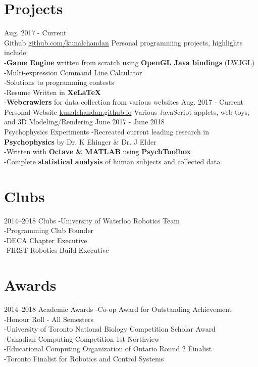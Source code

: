 \documentclass[]{chandan-cv}
\begin{document}
\section{Projects}

\begin{entrylist}
  \entry
    {Aug. 2017 - Current\\}
    {Github}
    {\href{https://github.com/kunalchandan}{github.com/kunalchandan}}
    {Personal programming projects, highlights include:
	\\-\textbf{Game Engine} written from scratch using \textbf{OpenGL Java bindings} (LWJGL)	
	\\-Multi-expression Command Line Calculator
	\\-Solutions to programming contests
	\\-Resume Written in \textbf{XeLaTeX}
	\\-\textbf{Webcrawlers} for data collection from various websites}
  \entry
    {Aug. 2017 - Current\\}
    {Personal Website}
    {\href{https://kunalchandan.github.io}{kunalchandan.github.io}}
    {Various JavaScript applets, web-toys, and 3D Modeling/Rendering}
  \entry
    {June 2017 - June 2018\\}
    {Psychophysics Experiments}
    {}
    {	-Recreated current leading research in \textbf{Psychophysics} by Dr. K Ehinger \& Dr. J Elder
	\\-Written with \textbf{Octave \& MATLAB} using \textbf{PsychToolbox}
	\\-Complete \textbf{statistical analysis} of human subjects and collected data}
\end{entrylist}

\section{Clubs}

\begin{entrylist}
  \entry
    {2014–2018}
    {Clubs}
    {}
    {	-University of Waterloo Robotics Team
	\\-Programming Club Founder
	\\-DECA Chapter Executive
	\\-FIRST Robotics Build Executive}
\end{entrylist}

\section{Awards}

\begin{entrylist}
  \entry
    {2014–2018}
    {Academic Awards}
    {}
    {-Co-op Award for Outstanding Achievement
    \\-Honour Roll - All Semesters
    \\-University of Toronto National Biology Competition Scholar Award
    \\-Canadian Computing Competition 1st Northview
    \\-Educational Computing Organization of Ontario Round 2 Finalist
    \\-Toronto Finalist for Robotics and Control Systems}
\end{entrylist}
\end{document}
